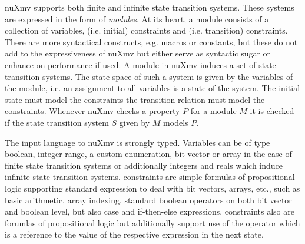 nuXmv supports both finite and infinite state transition systems.
These systems are expressed in the form of \textit{modules}.
At its heart, a module consists of a collection of variables,  (i.e. initial) constraints and  (i.e. transition) constraints.
There are more syntactical constructs, e.g. macros or constants, but these do not add to the expressiveness of nuXmv but either serve as syntactic sugar or enhance on performance if used.
A module in nuXmv induces a set of state transition systems.
The state space of such a system is given by the variables of the module, i.e. an assignment to all variables is a state of the system.
The initial state must model the  constraints the transition relation must model the  constraints.
Whenever nuXmv checks a property $ P $ for a module $ M $ it is checked if the state transition system $ S $ given by $ M $ models $ P $.

The input language to nuXmv is strongly typed.
Variables can be of type boolean, integer range, a custom enumeration, bit vector or array in the case of finite state transition systems or additionally integers and reals which induce infinite state transition systems.
 constraints are simple formulas of propositional logic supporting standard expression to deal with bit vectors, arrays, etc., such as basic arithmetic, array indexing, standard boolean operators on both bit vector and boolean level, but also case and if-then-else expressions.
 constraints also are forumlas of propositional logic but additionally support use of the  operator which is a reference to the value of the respective expression in the next state.

